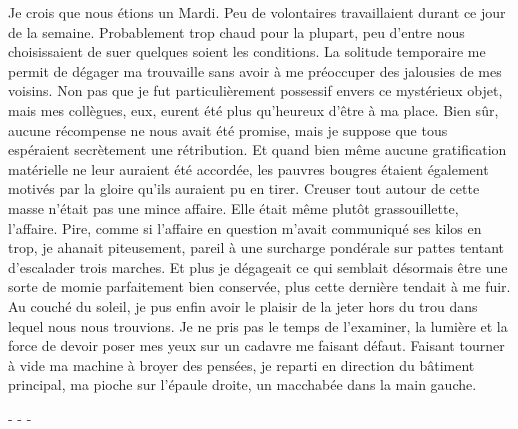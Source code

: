 \documentclass[12pt,a4paper,article]{memoir} %
\begin{document}
Je crois que nous \'{e}tions un Mardi. Peu de volontaires travaillaient durant ce jour de la semaine. Probablement trop chaud pour la plupart, peu d'entre nous choisissaient de suer quelques soient les conditions. La solitude temporaire me permit de d\'{e}gager ma trouvaille sans avoir \`{a} me pr\'{e}occuper des jalousies de mes voisins. Non pas que je fut particuli\`{e}rement possessif envers ce myst\'{e}rieux objet, mais mes coll\`{e}gues, eux, eurent \'{e}t\'{e} plus qu'heureux d'\^{e}tre \`{a} ma place. Bien s\^{u}r, aucune r\'{e}compense ne nous avait \'{e}t\'{e} promise, mais je suppose que tous esp\'{e}raient secr\`{e}tement une r\'{e}tribution. Et quand bien m\^{e}me aucune gratification mat\'{e}rielle ne leur auraient \'{e}t\'{e} accord\'{e}e, les pauvres bougres \'{e}taient \'{e}galement motiv\'{e}s par la gloire qu'ils auraient pu en tirer.
Creuser tout autour de cette masse n'\'{e}tait pas une mince affaire. Elle \'{e}tait m\^{e}me plut\^{o}t grassouillette, l'affaire. Pire, comme si l'affaire en question m'avait communiqu\'{e} ses kilos en trop, je ahanait piteusement, pareil \`{a} une surcharge pond\'{e}rale sur pattes tentant d'escalader trois marches. Et plus je d\'{e}gageait ce qui semblait d\'{e}sormais \^{e}tre une sorte de momie parfaitement bien conserv\'{e}e, plus cette derni\`{e}re tendait \`{a} me fuir.
Au couch\'{e} du soleil, je pus enfin avoir le plaisir de la jeter hors du trou dans lequel nous nous trouvions. Je ne pris pas le temps de l'examiner, la lumi\`{e}re et la force de devoir poser mes yeux sur un cadavre me faisant d\'{e}faut.\newline
Faisant tourner \`{a} vide ma machine \`{a} broyer des pens\'{e}es, je reparti en direction du b\^{a}timent principal, ma pioche sur l'\'{e}paule droite, un macchab\'{e}e dans la main gauche.

\centerline{- - -}
\end{document}
